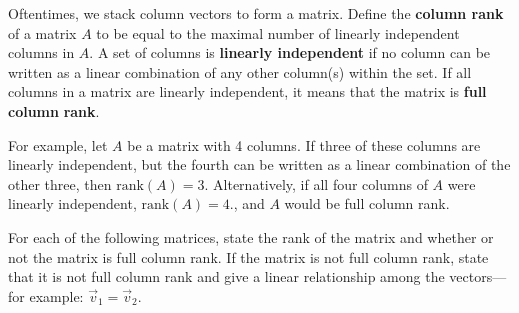 \documentclass[addpoints, 12pt]{exam}
\theoremstyle{definition}
\newtheorem*{answer}{Answer}
\begin{document}
\begin{questions}
Oftentimes, we stack column vectors to form a matrix. Define the \textbf{column rank} of a matrix $A$ to be equal to the maximal number of linearly independent columns in $A$. A set of columns is \textbf{linearly independent} if no column can be written as a linear combination of any other column(s) within the set. If all columns in a matrix are linearly
independent, it means that the matrix is \textbf{full column} \textbf{rank}.

For example, let $A$ be a matrix with 4 columns. If three of these columns are linearly independent, but the fourth can be written as a linear combination of the other three, then $\text{rank}(A) = 3$. Alternatively, if all four columns of $A$ were linearly independent,
$\text{rank}(A) = 4$., and $A$ would be full column rank.


For each of the following matrices, state the rank of the matrix and whether or not the
matrix is full column rank. If the matrix is not full column rank, state that it is not full column rank and give a linear relationship among the vectors—for example: $\vec{v}_1 = \vec{v}_2$.

\end{questions}
\end{document}

